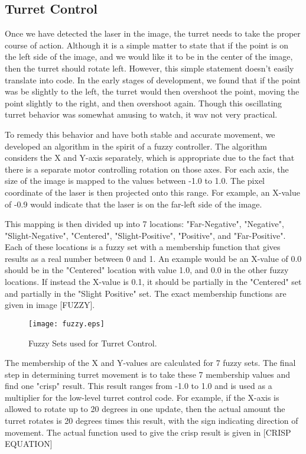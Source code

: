 \documentclass[10pt,twocolumn,letterpaper]{article}
\begin{document}
\subsection{Turret Control}

Once we have detected the laser in the image, the turret needs to take the proper course of action. Although it is a  simple matter to state that if the point is on the left side of the image, and we would like it to be in the center of the image, then the turret should rotate left. However, this simple statement doesn't easily translate into code.  In the early stages of development, we found that if the point was be slightly to the left, the turret would then overshoot the point, moving the point slightly to the right, and then overshoot again. Though this oscillating turret behavior was somewhat amusing to watch, it wav not very practical.

To remedy this behavior and have both stable and accurate movement, we developed an algorithm in the spirit of a fuzzy controller. The algorithm considers the X and Y-axis separately, which is appropriate due to the fact that there is a separate motor controlling rotation on those axes. For each axis, the size of the image is mapped to the values between -1.0 to 1.0. The pixel coordinate of the laser is then projected onto this range. For example, an X-value of -0.9 would indicate that the laser is on the far-left side of the image.

This mapping is then divided up into 7 locations:  "Far-Negative", "Negative", "Slight-Negative", "Centered", "Slight-Positive", "Positive", and "Far-Positive". Each of these locations is a fuzzy set with a membership function that gives results as a real number between 0 and 1. An example would be an X-value of 0.0 should be in the "Centered" location with value 1.0, and 0.0 in the other fuzzy locations. If instead the X-value is 0.1, it should be partially in the "Centered" set and partially in the "Slight Positive" set. The exact membership functions are given in image [FUZZY].

\begin{figure}[t]
\begin{center}
  \texttt{[image: fuzzy.eps]}
\end{center}
   \caption{Fuzzy Sets used for Turret Control.}
\end{figure}

The membership of the X and Y-values are calculated for 7 fuzzy sets. The final step in determining turret movement is to take these 7 membership values and find one "crisp" result. This result ranges from -1.0 to 1.0 and is used as a multiplier for the low-level turret control code. For example, if the X-axis is allowed to rotate up to 20 degrees in one update, then the actual amount the turret rotates is 20 degrees times this result, with the sign indicating direction of movement. The actual function used to give the crisp result is given in [CRISP EQUATION]
\end{document}
